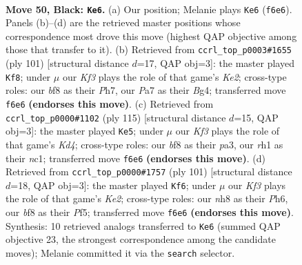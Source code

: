 \documentclass[11pt]{article}
\begin{document}
\clearpage

\begin{figure}[p]\centering
\begin{subfigure}{0.46\textwidth}\centering
\resizebox{\linewidth}{!}{%
\newchessgame
\chessboard[
  setfen={5B1N/p7/P4k2/1P3p2/3K1b2/8/8/7R b - - 7 50},
  showmover=false,
  pgfstyle=straightmove, color=movearrow, markmove={f6-e6}
]}
\caption{}
\end{subfigure}\hfill
\begin{subfigure}{0.46\textwidth}\centering
\resizebox{\linewidth}{!}{%
\newchessgame
\chessboard[
  setfen={8/4k1Np/5p2/8/4K1b1/6P1/7P/8 b - - 4 51},
  showmover=false,
  pgfstyle=straightmove, color=movearrow, markmove={e7-f8}
]}
\caption{}
\end{subfigure}
\\[4pt]
\begin{subfigure}{0.46\textwidth}\centering
\resizebox{\linewidth}{!}{%
\newchessgame
\chessboard[
  setfen={8/8/8/1b1k2p1/3p4/P4P2/6P1/2N1K3 b - - 3 58},
  showmover=false,
  pgfstyle=straightmove, color=movearrow, markmove={d5-e5}
]}
\caption{}
\end{subfigure}\hfill
\begin{subfigure}{0.46\textwidth}\centering
\resizebox{\linewidth}{!}{%
\newchessgame
\chessboard[
  setfen={8/4kp2/7p/3K1p1P/8/2bN2P1/5P2/8 b - - 0 51},
  showmover=false,
  pgfstyle=straightmove, color=movearrow, markmove={e7-f6}
]}
\caption{}
\end{subfigure}
\caption{\textbf{Move 50, Black: \texttt{Ke6}.} (a) Our position; Melanie plays \texttt{Ke6} (\texttt{f6e6}). Panels (b)--(d) are the retrieved master positions whose correspondence most drove this move (highest QAP objective among those that transfer to it). (b) Retrieved from \texttt{ccrl\_top\_p0003\#1655} (ply 101) [structural distance $d$=17, QAP obj=3]: the master played \texttt{Kf8}; under $\mu$ our \emph{Kf3} plays the role of that game's \emph{Ke2}; cross-type roles: our \emph{b}f8 as their \emph{P}h7, our \emph{P}a7 as their \emph{B}g4; transferred move \texttt{f6e6} \textbf{(endorses this move)}. (c) Retrieved from \texttt{ccrl\_top\_p0000\#1102} (ply 115) [structural distance $d$=15, QAP obj=3]: the master played \texttt{Ke5}; under $\mu$ our \emph{Kf3} plays the role of that game's \emph{Kd4}; cross-type roles: our \emph{b}f8 as their \emph{p}a3, our \emph{r}h1 as their \emph{n}c1; transferred move \texttt{f6e6} \textbf{(endorses this move)}. (d) Retrieved from \texttt{ccrl\_top\_p0000\#1757} (ply 101) [structural distance $d$=18, QAP obj=3]: the master played \texttt{Kf6}; under $\mu$ our \emph{Kf3} plays the role of that game's \emph{Ke2}; cross-type roles: our \emph{n}h8 as their \emph{P}h6, our \emph{b}f8 as their \emph{P}f5; transferred move \texttt{f6e6} \textbf{(endorses this move)}. Synthesis: 10 retrieved analogs transferred to \texttt{Ke6} (summed QAP objective 23, the strongest correspondence among the candidate moves); Melanie committed it via the \texttt{search} selector.}
\label{fig:thought-m99}
\end{figure}
\end{document}
